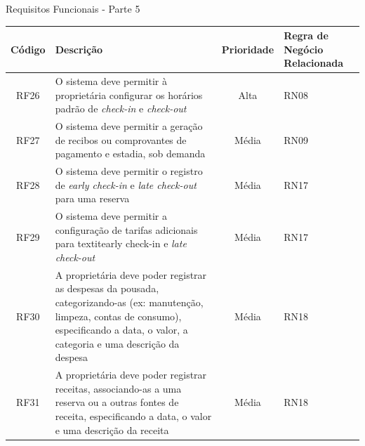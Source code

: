 \documentclass[
	12pt,				%
	openany,			%
	twoside,			%
	a4paper,			%
	english,			%
	french,				%
	spanish,			%
	brazil				%
	]{abntex2}
\begin{document}
\begin{quadro}[H]
	\caption{Requisitos Funcionais - Parte 5}
	\label{quadro_rf5}
	\begin{tabular}{|c|p{5cm}|c|p{4cm}|}
		\hline
		\textbf{Código} & \textbf{Descrição} & \textbf{Prioridade} & \textbf{Regra de Negócio Relacionada} \\ \hline
		RF26 & O sistema deve permitir à proprietária configurar os horários padrão de \textit{check-in} e \textit{check-out} & Alta & RN08 \\ \hline
		RF27 & O sistema deve permitir a geração de recibos ou comprovantes de pagamento e estadia, sob demanda & Média & RN09 \\ \hline
		RF28 & O sistema deve permitir o registro de \textit{early check-in} e \textit{late check-out} para uma reserva & Média & RN17 \\ \hline
		RF29 & O sistema deve permitir a configuração de tarifas adicionais para textit{early check-in} e \textit{late check-out} & Média & RN17 \\ \hline
		RF30 & A proprietária deve poder registrar as despesas da pousada, categorizando-as (ex: manutenção, limpeza, contas de consumo), especificando a data, o valor, a categoria e uma descrição da despesa & Média & RN18 \\ \hline
		RF31 & A proprietária deve poder registrar receitas, associando-as a uma reserva ou a outras fontes de receita, especificando a data, o valor e uma descrição da receita & Média & RN18 \\ \hline
	\end{tabular}
	
\end{quadro}
\end{document}
